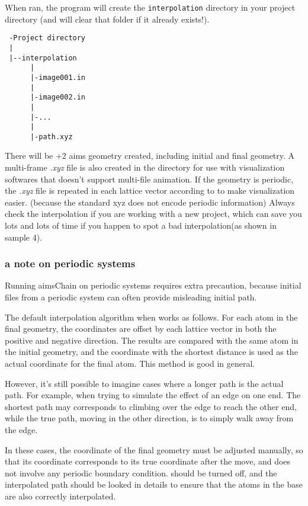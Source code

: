 When ran, the program will create the \texttt{interpolation} directory in your project directory (and will clear that folder if it already exists!). 
\begin{verbatim}
 -Project directory
 |
 |--interpolation
      |
      |-image001.in
      |
      |-image002.in
      |
      |-... 
      |
      |-path.xyz
\end{verbatim}

There will be +2 aims geometry created, including initial and final geometry. A multi-frame \textit{.xyz} file is also created in the directory for use with visualization softwares that doesn't support multi-file animation. If the geometry is periodic, the \textit{.xyz} file is repeated in each lattice vector according to  to make visualization easier. (because the standard xyz does not encode periodic information) Always check the interpolation if you are working with a new project, which can save you lots and lots of time if you happen to spot a bad interpolation(as shown in sample 4).

\subsubsection*{a note on periodic systems}
Running aimsChain on periodic systems requires extra precaution, because initial files from a periodic system can often provide misleading initial path. 

The default interpolation algorithm when  works as follows. For each atom in the final geometry, the coordinates are offset by each lattice vector in both the positive and negative direction. The results are compared with the same atom in the initial geometry, and the coordinate with the shortest distance is used as the actual coordinate for the final atom. This method is good in general. 

However, it's still possible to imagine cases where a longer path is the actual path. For example, when trying to simulate the effect of an edge on one end. The shortest path may corresponds to climbing over the edge to reach the other end, while the true path, moving in the other direction, is to simply walk away from the edge. 

In these cases, the coordinate of the final geometry must be adjusted manually, so that its coordinate corresponds to its true coordinate after the move, and does not involve any periodic boundary condition.  should be turned off, and the interpolated path should be looked in details to ensure that the atoms in the base are also correctly interpolated. 

